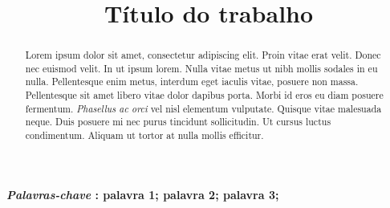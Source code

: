 \documentclass[10pt, conference, compsocconf]{IEEEtran}
\begin{document}
\title{Título do trabalho}

\author{
}

\maketitle

\begin{abstract}
Lorem ipsum dolor sit amet, consectetur adipiscing elit. Proin vitae erat velit. Donec nec euismod velit. In ut ipsum lorem. Nulla vitae metus ut nibh mollis sodales in eu nulla. Pellentesque enim metus, interdum eget iaculis vitae, posuere non massa. Pellentesque sit amet libero vitae dolor dapibus porta. Morbi id eros eu diam posuere fermentum. \textit{Phasellus ac orci} vel nisl elementum vulputate. Quisque vitae malesuada neque. Duis posuere mi nec purus tincidunt sollicitudin. Ut cursus luctus condimentum. Aliquam ut tortor at nulla mollis efficitur.

\end{abstract}


\textbf{\textit{Palavras-chave} : palavra 1; palavra 2; palavra 3; }


\IEEEpeerreviewmaketitle
\end{document}
